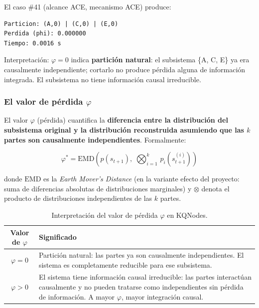 El caso \#41 (alcance ACE, mecanismo ACE) produce:

\begin{lstlisting}
Particion: (A,0) | (C,0) | (E,0)
Perdida (phi): 0.000000
Tiempo: 0.0016 s
\end{lstlisting}

Interpretación: $\varphi = 0$ indica \textbf{partición natural}: el subsistema
\{A, C, E\} ya era causalmente independiente; cortarlo no produce pérdida alguna
de información integrada. El subsistema no tiene información causal irreducible.

\subsubsection{El valor de pérdida $\varphi$}

El valor $\varphi$ (pérdida) cuantifica la \textbf{diferencia entre la distribución
del subsistema original y la distribución reconstruida asumiendo que las $k$ partes
son causalmente independientes}. Formalmente:

\begin{equation}
  \varphi^* = \mathrm{EMD}\!\left(
    p\!\left(s_{t+1}\right),\;
    \bigotimes_{i=1}^{k}\, p_i\!\left(s_{t+1}^{(i)}\right)
  \right)
\end{equation}

donde $\mathrm{EMD}$ es la \textit{Earth Mover's Distance} (en la variante efecto
del proyecto: suma de diferencias absolutas de distribuciones marginales) y $\otimes$
denota el producto de distribuciones independientes de las $k$ partes.

\begin{table}[h!]
\centering
\begin{tabular}{|c|p{9cm}|}
\hline
\textbf{Valor de $\varphi$} & \textbf{Significado} \\
\hline
$\varphi = 0$ & Partición natural: las partes ya son causalmente independientes.
                El sistema es completamente reducible para ese subsistema. \\
$\varphi > 0$ & El sistema tiene información causal irreducible: las partes
                interactúan causalmente y no pueden tratarse como independientes
                sin pérdida de información. A mayor $\varphi$, mayor integración
                causal. \\
\hline
\end{tabular}
\caption{Interpretación del valor de pérdida $\varphi$ en KQNodes.}
\label{tab:interpretacion_phi}
\end{table}

